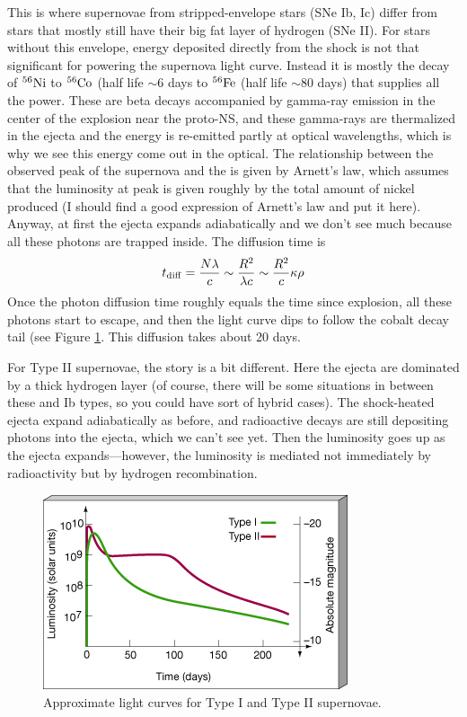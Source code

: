 This is where supernovae from stripped-envelope stars (SNe Ib, Ic) differ from stars that mostly still have their big fat layer of hydrogen (SNe II). For stars without this envelope, energy deposited directly from the shock is not that significant for powering the supernova light curve. Instead it is mostly the decay of $^{56}{\rm Ni}$ to $^{56}{\rm Co}$ (half life $\sim 6$ days to $^{56}{\rm Fe}$ (half life $\sim 80$ days) that supplies all the power. These are beta decays accompanied by gamma-ray emission in the center of the explosion near the proto-NS, and these gamma-rays are thermalized in the ejecta and the energy is re-emitted partly at optical wavelengths, which is why we see this energy come out in the optical. The relationship between the observed peak of the supernova and the is given by Arnett's law, which assumes that the luminosity at peak is given roughly by the total amount of nickel produced (I should find a good expression of Arnett's law and put it here). Anyway, at first the ejecta expands adiabatically and we don't see much because all these photons are trapped inside. The diffusion time is
\begin{equation}
t_{\rm diff} = \frac{N\lambda}{c} \sim \frac{R^2}{\lambda c} \sim \frac{R^2}{c} \kappa \rho
\end{equation}
Once the photon diffusion time roughly equals the time since explosion, all these photons start to escape, and then the light curve dips to follow the cobalt decay tail (see Figure \ref{f:sn_lc}. This diffusion takes about 20 days.

For Type II supernovae, the story is a bit different. Here the ejecta are dominated by a thick hydrogen layer (of course, there will be some situations in between these and Ib types, so you could have sort of hybrid cases). The shock-heated ejecta expand adiabatically as before, and radioactive decays are still depositing photons into the ejecta, which we can't see yet. Then the luminosity goes up as the ejecta expands---however, the luminosity is mediated not immediately by radioactivity but by hydrogen recombination.

\begin{figure}[!h]
\begin{center}
\includegraphics[width=\textwidth]{sn_lc.jpg}
\caption{Approximate light curves for Type I and Type II supernovae. \label{f:sn_lc}}
\end{center}
\end{figure}

